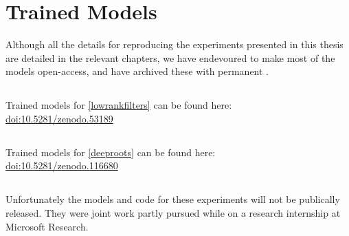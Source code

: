 \documentclass[thesis]{subfiles}
\begin{document}

\chapter{Trained Models}
\label{trainedmodels}
Although all the details for reproducing the experiments presented in this thesis are detailed in the relevant chapters, we have endevoured to make most of the models open-access, and have archived these with permanent .
\section*{}
Trained models for \cref{lowrankfilters} can be found here:\\
\href{https://doi.org/10.5281/zenodo.53189}{doi:10.5281/zenodo.53189}
\section*{}
Trained models for \cref{deeproots} can be found here:\\
\href{https://doi.org/10.5281/zenodo.116680}{doi:10.5281/zenodo.116680}
\section*{}
Unfortunately the models and code for these experiments will not be publically released. They were joint work partly pursued while on a research internship at Microsoft Research.
\end{document}
